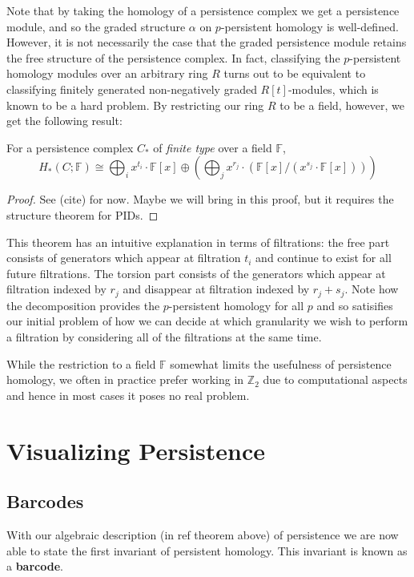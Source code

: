 Note that by taking the homology of a persistence complex we get a persistence module, and so the graded structure $\alpha$ on  $p$-persistent homology is well-defined. However, it is not necessarily the case that the graded persistence module retains the free structure of the persistence complex. In fact, classifying the $p$-persistent homology modules over an arbitrary ring $R$ turns out to be equivalent to classifying finitely generated non-negatively graded $R[t]$-modules, which is known to be a hard problem. By restricting our ring $R$ to be a field, however, we get the following result:
\begin{theorem}
  For a persistence complex $C_{*}$ of \textit{finite type} over a field $\mathbb{F}$,
  \[H_{*}(C;\mathbb{F}) \cong \bigoplus_{i} x^{t_{i}} \cdot \mathbb{F}[x] \oplus (\bigoplus_{j} x^{r_{j}} \cdot (\mathbb{F}[x]/(x^{s_{j}} \cdot \mathbb{F}[x]))) \]
\end{theorem}
\begin{proof}
See (cite) for now. Maybe we will bring in this proof, but it requires the structure theorem for PIDs.
\end{proof}
This theorem has an intuitive explanation in terms of filtrations: the free part consists of generators which appear at filtration $t_{i}$ and continue to exist for all future filtrations. The torsion part consists of the generators which appear at filtration indexed by $r_{j}$ and disappear at filtration indexed by $r_{j}+s_{j}$. Note how the decomposition provides the $p$-persistent homology for all $p$ and so satisifies our initial problem of how we can decide at which granularity we wish to perform a filtration by considering all of the filtrations at the same time.

While the restriction to a field $\mathbb{F}$ somewhat limits the usefulness of persistence homology, we often in practice prefer working in $\mathbb{Z}_{2}$ due to computational aspects and hence in most cases it poses no real problem.
\section{Visualizing Persistence}
\subsection{Barcodes}
With our algebraic description (in ref theorem above) of persistence we are now able to state the first invariant of persistent homology. This invariant is known as a \textbf{barcode}.


